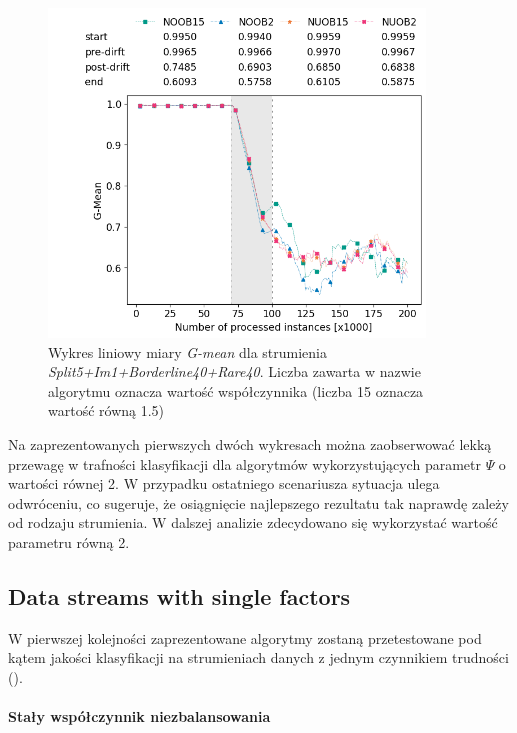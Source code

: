 \begin{figure}[h]
    \centering
    \includegraphics[width=10cm]{figures/split5im1borderline40rare40_psi.png}
    \caption{Wykres liniowy miary \textit{G-mean} dla strumienia \textit{Split5+Im1+Borderline40+Rare40}. Liczba zawarta w nazwie algorytmu oznacza wartość współczynnika (liczba 15 oznacza wartość równą 1.5)}\label{Figure:PsiParametrization2}
\end{figure}

\noindent Na zaprezentowanych pierwszych dwóch wykresach można zaobserwować lekką przewagę w trafności klasyfikacji dla algorytmów wykorzystujących parametr $\Psi$ o wartości równej 2. W przypadku ostatniego scenariusza sytuacja ulega odwróceniu, co sugeruje, że osiągnięcie najlepszego rezultatu tak naprawdę zależy od rodzaju strumienia. W dalszej analizie zdecydowano się wykorzystać wartość parametru równą 2.

\newpage

\subsection{Data streams with single factors}

\noindent W pierwszej kolejności zaprezentowane algorytmy zostaną przetestowane pod kątem jakości klasyfikacji na strumieniach danych z jednym czynnikiem trudności ().\\\\
\textbf{Stały współczynnik niezbalansowania}\\

